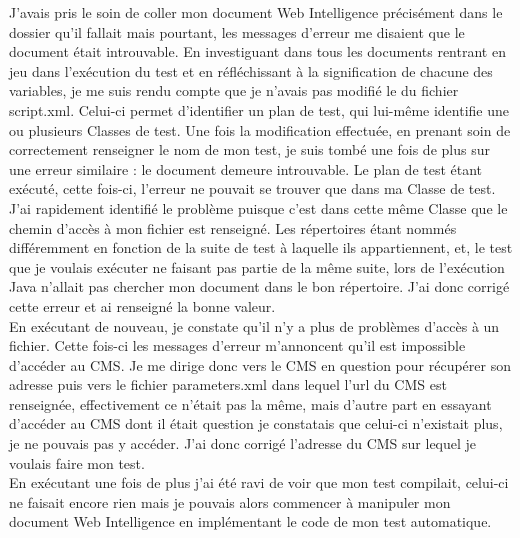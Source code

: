 J'avais pris le soin de coller mon document Web Intelligence pr\'{e}cis\'{e}ment dans le dossier qu'il fallait mais pourtant, les messages d'erreur me disaient que le document \'{e}tait introuvable. En investiguant dans tous les documents rentrant en jeu dans l'ex\'{e}cution du test et en r\'{e}fl\'{e}chissant \`{a} la signification de chacune des variables, je me suis rendu compte que je n'avais pas modifi\'{e} le  du fichier script.xml. Celui-ci permet d'identifier un plan de test, qui lui-m\^{e}me identifie une ou plusieurs \gls{Classe}s de test. Une fois la modification effectu\'{e}e, en prenant soin de correctement renseigner le nom de mon test, je suis tomb\'{e} une fois de plus sur une erreur similaire : le document demeure introuvable. Le plan de test \'{e}tant ex\'{e}cut\'{e}, cette fois-ci, l'erreur ne pouvait se trouver que dans ma \gls{Classe} de test. J'ai rapidement identifi\'{e} le probl\`{e}me puisque c'est dans cette m\^{e}me \gls{Classe} que le chemin d'acc\`{e}s \`{a} mon fichier est renseign\'{e}. Les r\'{e}pertoires \'{e}tant nomm\'{e}s diff\'{e}remment en fonction de la suite de test \`{a} laquelle ils appartiennent, et, le test que je voulais ex\'{e}cuter ne faisant pas partie de la m\^{e}me suite, lors de l'ex\'{e}cution \gls{Java} n'allait pas chercher mon document dans le bon r\'{e}pertoire. J'ai donc corrig\'{e} cette erreur et ai renseign\'{e} la bonne valeur.\\
En ex\'{e}cutant de nouveau, je constate qu'il n'y a plus de probl\`{e}mes d'acc\`{e}s \`{a} un fichier. Cette fois-ci les messages d'erreur m'annoncent qu'il est impossible d'acc\'{e}der au \gls{CMS}. Je me dirige donc vers le \gls{CMS} en question pour r\'{e}cup\'{e}rer son adresse puis vers le fichier parameters.xml dans lequel l'url du \gls{CMS} est renseign\'{e}e, effectivement ce n'\'{e}tait pas la m\^{e}me, mais d'autre part en essayant d'acc\'{e}der au \gls{CMS} dont il \'{e}tait question je constatais que celui-ci n'existait plus, je ne pouvais pas y acc\'{e}der. J'ai donc corrig\'{e} l'adresse du \gls{CMS} sur lequel je voulais faire mon test.\\
En ex\'{e}cutant une fois de plus j'ai \'{e}t\'{e} ravi de voir que mon test compilait, celui-ci ne faisait encore rien mais je pouvais alors commencer \`{a} manipuler mon document Web Intelligence en impl\'{e}mentant le code de mon test automatique.\\

